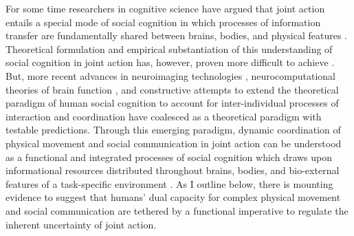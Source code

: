 \begin{CJK}{UTF8}{gbsn}
For some time researchers in cognitive science have argued that joint action entails a special mode of social cognition in which processes of information transfer are fundamentally shared between brains, bodies, and physical features \citep{Hutchins1995,Kirsh2006,Susi2001}.  Theoretical formulation and empirical substantiation of this understanding of social cognition in joint action has, however, proven more difficult to achieve \citep[due in part to the tendency of the MES and CR to preference the functional role of symbolic and amodal cognitive processes; see][]{Semin2008,Yufik2013}.
But, more recent advances in neuroimaging technologies \citep{Frith2007}, neurocomputational theories of brain function \citep{Friston2010,Frith2010,Yufik2013,Clark2013}, and constructive attempts to extend the theoretical paradigm of human social cognition to account for inter-individual processes of interaction and coordination \citep[e.g.][]{Sebanz2006,Semin2008,Dale2014} have coalesced as a theoretical paradigm with testable predictions.  Through this emerging paradigm, dynamic coordination of physical movement and social communication in joint action can be understood as a functional and integrated processes of social cognition which draws upon informational resources distributed throughout brains, bodies, and bio-external features of a task-specific environment \citep{Clark2015}.   As I outline below, there is mounting evidence to suggest that humans' dual capacity for complex physical movement and social communication are tethered by a functional imperative to regulate the inherent uncertainty of joint action.





















\end{CJK}
